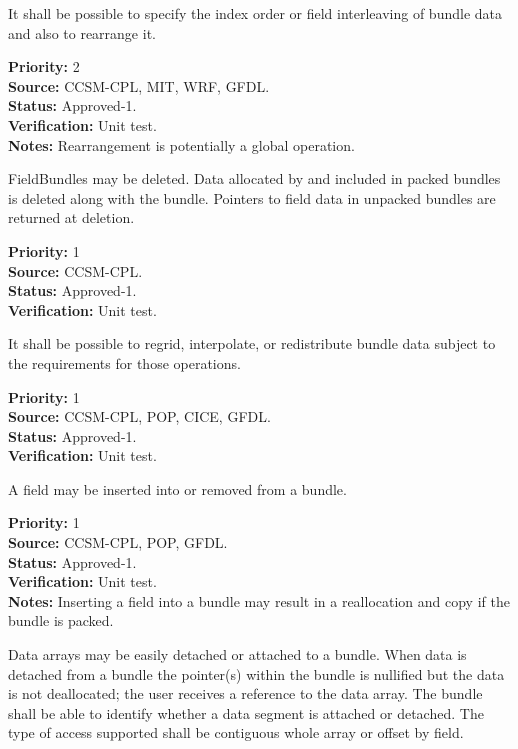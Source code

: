 It shall be possible to specify the index order or field 
interleaving of bundle data and also to rearrange it. 
\begin{reqlist}
{\bf Priority:} 2 \\
{\bf Source:} CCSM-CPL, MIT, WRF, GFDL. \\
{\bf Status:} Approved-1. \\
{\bf Verification:} Unit test. \\
{\bf Notes:} Rearrangement is potentially a global operation.
\end{reqlist}

FieldBundles may be deleted.  Data allocated by and included in packed bundles 
is deleted along with the bundle.  Pointers to field data in unpacked bundles
are returned at deletion.
\begin{reqlist} 
{\bf Priority:} 1\\
{\bf Source:} CCSM-CPL. \\
{\bf Status:} Approved-1. \\
{\bf Verification:} Unit test. 
\end{reqlist}


It shall be possible to regrid, interpolate, or redistribute bundle data
subject to the requirements for those operations.
\begin{reqlist}
{\bf Priority:} 1\\
{\bf Source:} CCSM-CPL, POP, CICE, GFDL. \\
{\bf Status:} Approved-1. \\
{\bf Verification:} Unit test. 
\end{reqlist}

A field may be inserted into or removed from a bundle.
\begin{reqlist}
{\bf Priority:} 1\\
{\bf Source:} CCSM-CPL, POP, GFDL. \\
{\bf Status:} Approved-1. \\
{\bf Verification:} Unit test. \\
{\bf Notes:} Inserting a field into a bundle may result in a reallocation and 
copy if the bundle is packed.  
\end{reqlist}

Data arrays may be easily detached or attached to a bundle.  When data
is detached from a bundle the pointer(s) within the bundle is nullified 
but the data is not deallocated; the user receives a reference to the data 
array.  The bundle shall be able to identify 
whether a data segment is attached or detached.  The type of access 
supported shall be contiguous whole array or offset by field.

